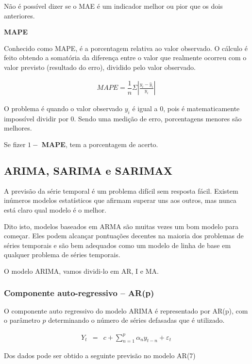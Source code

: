 Não é possível dizer se o MAE é um indicador melhor ou pior que os dois anteriores.

\textbf{MAPE}

Conhecido como MAPE, é a porcentagem relativa ao valor observado. O cálculo é feito obtendo a somatória da diferença entre o valor que realmente ocorreu com o valor previsto (resultado do erro), dividido pelo valor observado.

\begin{eqnarray}
	M A P E=\dfrac{1}{n} \Sigma\left|\frac{y_i-\hat{y}_i}{y_i}\right|\label{eq:mape}
\end{eqnarray}

O problema é quando o valor observado $y_i$ é igual a $0$, pois é matematicamente impossível dividir por $0$. Sendo uma medição de erro, porcentagens menores são melhores.

Se fizer $1 -$ \textbf{MAPE}, tem a porcentagem de acerto.

\subsection{ARIMA, SARIMA e SARIMAX}\label{subsec:arima}

A previsão da série temporal é um problema difícil sem resposta fácil. Existem inúmeros modelos estatísticos que afirmam superar uns aos outros, mas nunca está claro qual modelo é o melhor.

Dito isto, modelos baseados em ARMA são muitas vezes um bom modelo para começar. Eles podem alcançar pontuações decentes na maioria dos problemas de séries temporais e são bem adequados como um modelo de linha de base em qualquer problema de séries temporais.


O modelo ARIMA, vamos dividi-lo em AR, I e MA.

\subsubsection{Componente auto-regressivo -- AR(p)}

O componente auto regressivo do modelo ARIMA é representado por AR(p), com o parâmetro $ p $ determinando o número de séries defasadas que é utilizado.

\begin{eqnarray}
	Y_t&=&c+\sum_{n=1}^{p} \alpha_n y_{t-n} + \varepsilon_t\label{AR}
\end{eqnarray}

Dos dados pode ser obtido a seguinte previsão no modelo AR(7)

